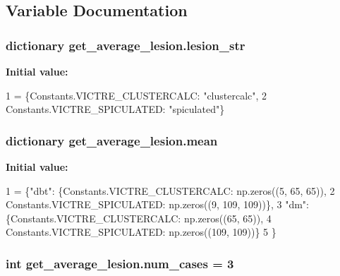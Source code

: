 \subsection{Variable Documentation}
\hypertarget{namespaceget__average__lesion_a04e4f7fdef2b31493b5aab71ddf47d7f}{
\subsubsection[{lesion\-\_\-str}]{\setlength{\rightskip}{0pt plus 5cm}dictionary get\-\_\-average\-\_\-lesion.\-lesion\-\_\-str}}\label{namespaceget__average__lesion_a04e4f7fdef2b31493b5aab71ddf47d7f}
{\bfseries Initial value\-:}
\begin{DoxyCode}
1 = \{Constants.VICTRE\_CLUSTERCALC: \textcolor{stringliteral}{"clustercalc"},
2               Constants.VICTRE\_SPICULATED: \textcolor{stringliteral}{"spiculated"}\}
\end{DoxyCode}
\hypertarget{namespaceget__average__lesion_a1fd4bf63fb19d5891e9e0d3390074201}{
\subsubsection[{mean}]{\setlength{\rightskip}{0pt plus 5cm}dictionary get\-\_\-average\-\_\-lesion.\-mean}}\label{namespaceget__average__lesion_a1fd4bf63fb19d5891e9e0d3390074201}
{\bfseries Initial value\-:}
\begin{DoxyCode}
1 = \{\textcolor{stringliteral}{"dbt"}: \{Constants.VICTRE\_CLUSTERCALC: np.zeros((5, 65, 65)),
2                 Constants.VICTRE\_SPICULATED: np.zeros((9, 109, 109))\},
3         \textcolor{stringliteral}{"dm"}: \{Constants.VICTRE\_CLUSTERCALC: np.zeros((65, 65)),
4                Constants.VICTRE\_SPICULATED: np.zeros((109, 109))\}
5         \}
\end{DoxyCode}
\hypertarget{namespaceget__average__lesion_aa8eb6c12f2c638c3c97b5cbb4f7aa6b0}{
\subsubsection[{num\-\_\-cases}]{\setlength{\rightskip}{0pt plus 5cm}int get\-\_\-average\-\_\-lesion.\-num\-\_\-cases = 3}}\label{namespaceget__average__lesion_aa8eb6c12f2c638c3c97b5cbb4f7aa6b0}
